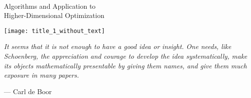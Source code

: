\cleardoublepage

\thispagestyle{empty}

\begin{spacing}{1}
  \setlength{\parindent}{0pt}
  
  {\LARGE\itshape\theauthor\par}
  
  \vspace{4em}
  
  {%
    \fontsize{40}{48}\selectfont\sffamily\bfseries%
    \hspace*{-0.1em}\\%
    \hspace*{-0.1em}%
    \par%
  }
  
  \vspace{2em}
  
  {\LARGE Algorithms and Application to\\Higher-Dimensional Optimization\par}
  
  \vfill
  
  \begin{center}
    \texttt{[image: title\_1\_without\_text]}
  \end{center}
  
  \vfill
  
  {%
    \hfill%
    \hfill%
    \hfill%
    \par%
  }
\end{spacing}

\pagebreak

\thispagestyle{empty}

\vspace*{\fill}

\begin{minipage}{0.865\textwidth}%
  \begin{center}
    \begin{minipage}{0.65\textwidth}%
      \begin{flushleft}
        {\hugequote}%
        \textit{%
          It seems that it is not enough to have a good idea or insight.
          One needs, like Schoenberg, the appreciation and courage to develop the idea
          systematically, make its objects mathematically presentable by giving them
          names, and give them much exposure in many papers.%
        }
      \end{flushleft}
      \begin{flushright}
        \small--- Carl de Boor \cite{boor16}
      \end{flushright}
    \end{minipage}%
  \end{center}
\end{minipage}

